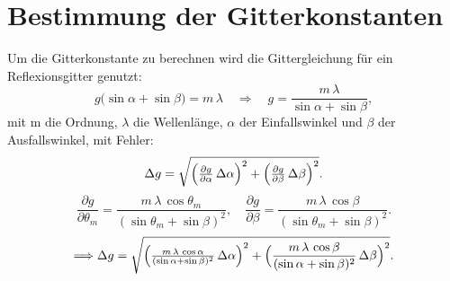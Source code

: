 \section{Bestimmung der Gitterkonstanten}
Um die Gitterkonstante zu berechnen wird die Gittergleichung für ein Reflexionsgitter genutzt:
\begin{equation}
  g\bigl(\sin\alpha + \sin\beta\bigr) = m\,\lambda
  \quad\Longrightarrow\quad
  g = \frac{m\,\lambda}{\sin\alpha + \sin\beta},
  \label{Gittergleichung}
\end{equation}
mit m die Ordnung, $\lambda$ die Wellenlänge, $\alpha$ der Einfallswinkel und $\beta$ der Ausfallswinkel, mit Fehler:
\begin{equation}
  \Delta g
  = \sqrt{
    \Bigl(\tfrac{\partial g}{\partial\alpha}\,\Delta\alpha\Bigr)^{2}
   +\Bigl(\tfrac{\partial g}{\partial\beta}\,\Delta\beta\Bigr)^{2}
  }.
  \label{Gitterfgleichung fehler}
\end{equation}
\begin{equation}
  \frac{\partial g}{\partial\theta_m}
  = \frac{m\,\lambda\,\cos\theta_m}{(\sin\theta_m + \sin\beta)^{2}},
  \quad
  \frac{\partial g}{\partial\beta}
  = \frac{m\,\lambda\,\cos\beta}{(\sin\theta_m + \sin\beta)^{2}}.
\end{equation}
\begin{equation}
    \Longrightarrow \Delta g = \sqrt{\Bigl(\tfrac{m\,\lambda\,\cos{\alpha}}{(\sin{\alpha}+\sin{\beta})^2}\,\Delta\alpha\Bigr)^2 + \Bigl(\frac{m\,\lambda\,\cos{\beta}}{(\sin{\alpha} + \sin{\beta})^2}\,\Delta\beta\Bigr)^2}.
\end{equation}

